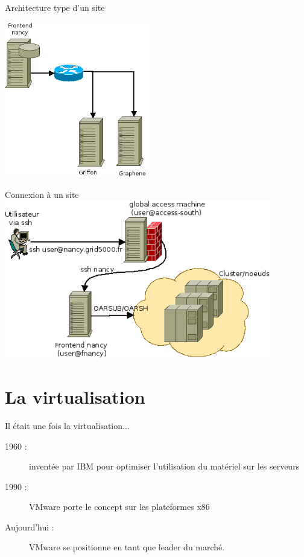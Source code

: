 \documentclass{beamer}
\begin{document}
\begin{frame}{Architecture type d'un site}
  \begin{center}
    \includegraphics[width=180pt]{images_presentation/archi.png}
  \end{center}
\end{frame}

\begin{frame}{Connexion à un site}
  \includegraphics[width=330pt]{images_presentation/plan_site.png}
\end{frame}


\section{La virtualisation}
\begin{frame}{Il était une fois la virtualisation...}
  \begin{description}
    \item[1960 : ] inventée par IBM pour optimiser l'utilisation du matériel sur les serveurs
\pause
    \item[1990 : ] VMware porte le concept sur les plateformes x86
\pause
    \item[Aujourd'hui : ] VMware se positionne en tant que leader du marché.
  \end{description}
\end{frame}
\end{document}
